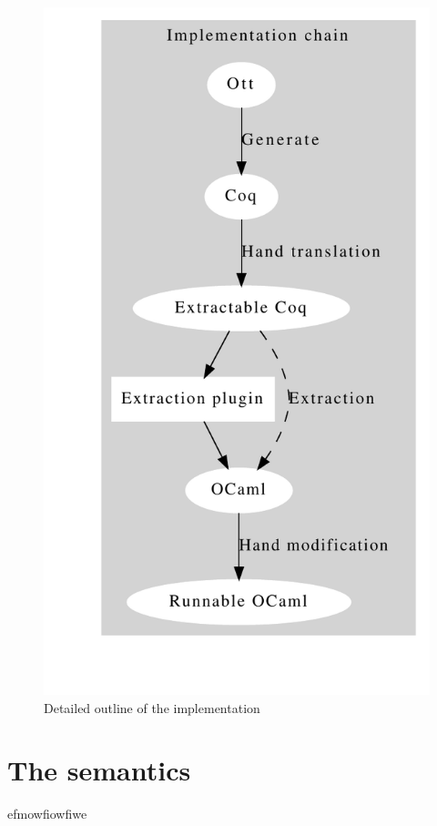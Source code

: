 \documentclass[12pt,twoside,notitlepage]{report}
\begin{document}
\begin{figure}[h]
\begin{center}
\includegraphics[scale=0.5]{implOut}
\caption{Detailed outline of the implementation}
\end{center}
\end{figure}
\section{The semantics}
efmowfiowfiwe
\end{document}
